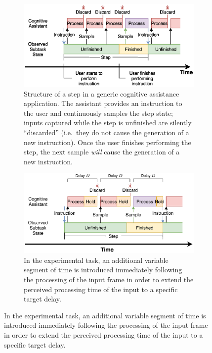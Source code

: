 \begin{figure}[h]
    \centering
    \begin{subfigure}[t]{.49\textwidth}
        \centering
        \includegraphics[width=\textwidth]{publications/2021ImpactDelayedResponse/Fig4a.eps}
        \caption{Structure of a step in a generic cognitive assistance application.
            The assistant provides an instruction to the user and continuously samples the step state; inputs captured while the step is unfinished are silently ``discarded'' (i.e.\ they do not cause the generation of a new instruction).
            Once the user finishes performing the step, the next sample \emph{will} cause the generation of a new instruction.
        }
        \label{fig:cogassist:step}
    \end{subfigure}%
    \hfill%
    \begin{subfigure}[t]{.49\textwidth}
        \centering
        \includegraphics[width=\textwidth]{publications/2021ImpactDelayedResponse/Fig4b.eps}
        \caption{In the experimental task, an additional variable segment of time is introduced immediately following the processing of the input frame in order to extend the perceived processing time of the input to a specific target delay.}%

\end{subfigure}
\end{figure}
